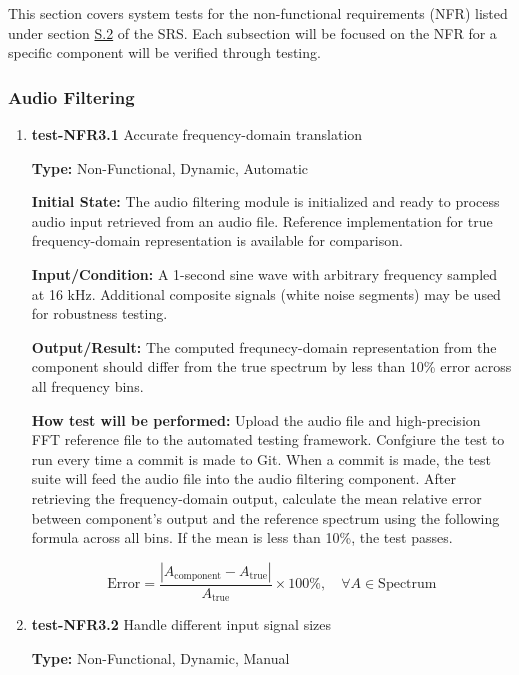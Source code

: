 \documentclass[12pt, titlepage]{article}
\begin{document}
This section covers system tests for the non-functional requirements (NFR) 
listed under section \hyperref[SRS-sec:S.2]{S.2} of the SRS. Each subsection 
will be focused on the NFR for a specific component will be verified through 
testing.

\subsubsection{Audio Filtering}
		

\begin{enumerate}

\item{\textbf{test-NFR3.1} Accurate frequency-domain translation\\}

\textbf{Type:} Non-Functional, Dynamic, Automatic
					
\textbf{Initial State:} 
The audio filtering module is initialized and ready to process audio input 
retrieved from an audio file. Reference implementation for true 
frequency-domain representation is available for comparison. 
					
\textbf{Input/Condition:} 
A 1-second sine wave with arbitrary frequency sampled at 16 kHz. Additional 
composite signals (white noise segments) may be used for robustness testing. 
					
\textbf{Output/Result:} 
The computed frequnecy-domain representation from the component should differ 
from the true spectrum by less than 10\% error across all frequency bins. 
					
\textbf{How test will be performed:} 
Upload the audio file and high-precision FFT reference file to the automated 
testing framework. Confgiure the test to run every time a commit is made to 
Git. When a commit is made, the test suite will feed the audio file into the 
audio filtering component. After retrieving the frequency-domain output, 
calculate the mean relative error between component's output and the reference 
spectrum using the following formula across all bins. If the mean is less than 
10\%, the test passes. 

\[
\text{Error} = \frac{\left|A_{\text{component}} - A_{\text{true}}\right|}{A_{\text{true}}} \times 100\%, 
\quad \forall A \in \text{Spectrum}
\]
					
\item{\textbf{test-NFR3.2} Handle different input signal sizes\\}

\textbf{Type:} Non-Functional, Dynamic, Manual
					

\end{enumerate}
\end{document}
